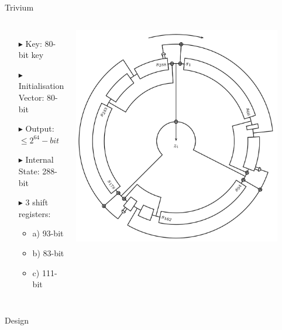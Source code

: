 \documentclass[10pt, compress]{beamer}
\begin{document}
\begin{frame}{Trivium}
\begin{columns}
\begin{itemize}[itemsep=0.5cm]
\item[$\blacktriangleright$] Key: 80-bit key
\item[$\blacktriangleright$] Initialisation Vector: 80-bit
\item[$\blacktriangleright$] Output: $\leq2^{64}-bit$
\item[$\blacktriangleright$] Internal State: 288-bit
\item[$\blacktriangleright$] 3 shift registers:
\begin{itemize}
\item a) 93-bit
\item b) 83-bit
\item c) 111-bit
\end{itemize}
\end{itemize}
\includegraphics[width=0.9\textwidth]{presentation/figures/round.png}\cite{circle}
\end{columns}
\end{frame}

\begin{frame}{Design}
\begin{figure}

\end{figure}
\end{frame}
\end{document}
